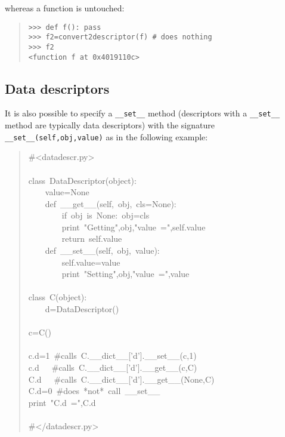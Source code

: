 \documentclass[10pt,english]{article}
\begin{document}
whereas a function is untouched:
\begin{quote}
\begin{verbatim}>>> def f(): pass
>>> f2=convert2descriptor(f) # does nothing
>>> f2
<function f at 0x4019110c>\end{verbatim}
\end{quote}



\hypertarget{data-descriptors}{}
\subsection*{Data descriptors}

It is also possible to specify a \texttt{{\_}{\_}set{\_}{\_}} method (descriptors
with a \texttt{{\_}{\_}set{\_}{\_}} method are typically data descriptors) with
the signature \texttt{{\_}{\_}set{\_}{\_}(self,obj,value)} as in the following
example:
\begin{quote}
\begin{ttfamily}\begin{flushleft}
\mbox{{\#}<datadescr.py>}\\
\mbox{}\\
\mbox{class~DataDescriptor(object):}\\
\mbox{~~~~value=None}\\
\mbox{~~~~def~{\_}{\_}get{\_}{\_}(self,~obj,~cls=None):}\\
\mbox{~~~~~~~~if~obj~is~None:~obj=cls}\\
\mbox{~~~~~~~~print~"Getting",obj,"value~=",self.value}\\
\mbox{~~~~~~~~return~self.value}\\
\mbox{~~~~def~{\_}{\_}set{\_}{\_}(self,~obj,~value):}\\
\mbox{~~~~~~~~self.value=value}\\
\mbox{~~~~~~~~print~"Setting",obj,"value~=",value}\\
\mbox{}\\
\mbox{class~C(object):}\\
\mbox{~~~~d=DataDescriptor()}\\
\mbox{}\\
\mbox{c=C()}\\
\mbox{}\\
\mbox{c.d=1~{\#}calls~C.{\_}{\_}dict{\_}{\_}['d'].{\_}{\_}set{\_}{\_}(c,1)}\\
\mbox{c.d~~~{\#}calls~C.{\_}{\_}dict{\_}{\_}['d'].{\_}{\_}get{\_}{\_}(c,C)}\\
\mbox{C.d~~~{\#}calls~C.{\_}{\_}dict{\_}{\_}['d'].{\_}{\_}get{\_}{\_}(None,C)}\\
\mbox{C.d=0~{\#}does~*not*~call~{\_}{\_}set{\_}{\_}}\\
\mbox{print~"C.d~=",C.d}\\
\mbox{}\\
\mbox{{\#}</datadescr.py>}
\end{flushleft}\end{ttfamily}
\end{quote}
\end{document}
